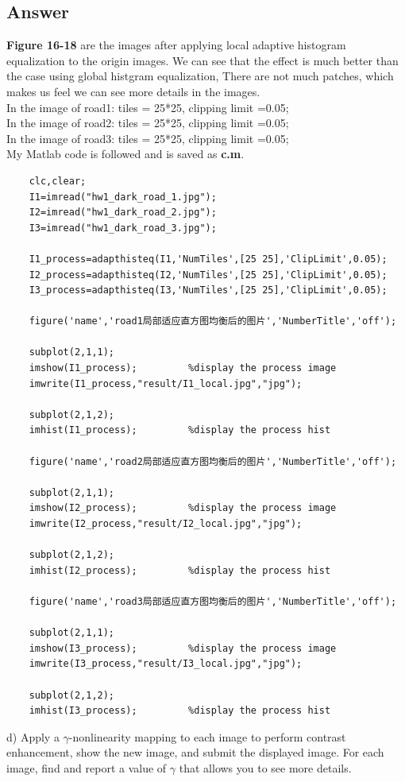\documentclass[
	12pt, %
]{fphw}
\begin{document}
\subsection*{Answer} 
\textbf{Figure 16-18} are the images after applying local adaptive histogram equalization to the origin images. We can see that the effect is much better than the case using global histgram equalization, There are not much patches, which makes us feel we can see more details in the images.\\
In the image of road1: tiles = 25*25, clipping limit =0.05;\\
In the image of road2: tiles = 25*25, clipping limit =0.05;\\
In the image of road3: tiles = 25*25, clipping limit =0.05;\\
My Matlab code is followed and is saved as \textbf{c.m}.
\begin{lstlisting}
	clc,clear;
	I1=imread("hw1_dark_road_1.jpg");
	I2=imread("hw1_dark_road_2.jpg");
	I3=imread("hw1_dark_road_3.jpg");

	I1_process=adapthisteq(I1,'NumTiles',[25 25],'ClipLimit',0.05);
	I2_process=adapthisteq(I2,'NumTiles',[25 25],'ClipLimit',0.05); 
	I3_process=adapthisteq(I3,'NumTiles',[25 25],'ClipLimit',0.05); 

	figure('name','road1局部适应直方图均衡后的图片','NumberTitle','off');

	subplot(2,1,1);
	imshow(I1_process);         %display the process image
	imwrite(I1_process,"result/I1_local.jpg","jpg");
			
	subplot(2,1,2);
	imhist(I1_process);         %display the process hist

	figure('name','road2局部适应直方图均衡后的图片','NumberTitle','off');

	subplot(2,1,1);
	imshow(I2_process);         %display the process image
	imwrite(I2_process,"result/I2_local.jpg","jpg");
			
	subplot(2,1,2);
	imhist(I2_process);         %display the process hist

	figure('name','road3局部适应直方图均衡后的图片','NumberTitle','off');

	subplot(2,1,1);
	imshow(I3_process);         %display the process image
	imwrite(I3_process,"result/I3_local.jpg","jpg");
			
	subplot(2,1,2);
	imhist(I3_process);         %display the process hist
\end{lstlisting}
\begin{problem}
	d)  Apply a $\gamma$-nonlinearity mapping to each image to perform contrast enhancement, show the new image, and
	submit the displayed image. For each image, find and report a value of $\gamma$ that allows you to see more details.
	
\end{problem}
\end{document}
